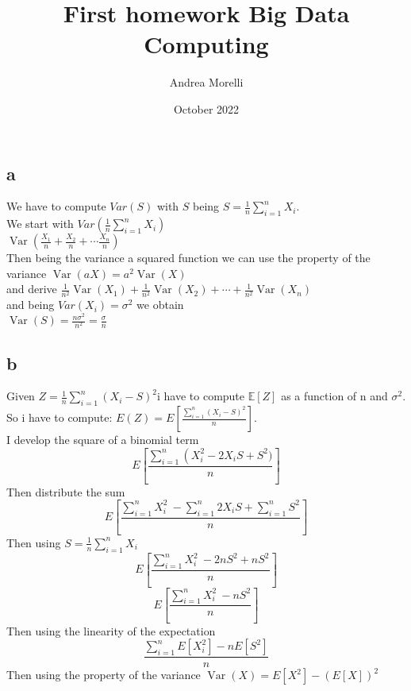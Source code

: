 \documentclass{article}
\title{First homework Big Data Computing}
\author{Andrea Morelli}
\date{October 2022}
\begin{document}
\maketitle

\section{}

\section{}
\subsection{a}
We have to compute $Var(S)$ with $S$ being 
$S=\frac{1}{n} \sum_{i=1}^n X_i$.\\
We start with $Var(\frac{1}{n} \sum_{i=1}^n X_i)$\\
$
\operatorname{Var}\left(\frac{X_1}{n}+\frac{X_2}{n}+\cdots \frac{X_n}{n}\right)
$\\
Then being the variance a squared function we can use the property of the variance $\operatorname{Var}(a X)=a^2 \operatorname{Var}(X)$\\
and derive $\frac{1}{n^2} \operatorname{Var}\left(X_1\right)+\frac{1}{n^2} \operatorname{Var}\left(X_2\right)+\cdots+\frac{1}{n^2} \operatorname{Var}\left(X_n\right)$\\
and being $Var(X_i)=\sigma^2$ we obtain\\
$\operatorname{Var}(S)=\frac{n \sigma^2}{n^2}=\frac{\sigma}{n}$


\subsection{b}
Given $Z=\frac{1}{n} \sum_{i=1}^n\left(X_i-S\right)^2$i have to compute $\mathbb{E}[Z]$ as a function of n and $\sigma^2$.
So i have to compute: $E\left(Z\right)=E\left[\frac{\sum_{i=1}^n\left(X_i-S\right)^2}{n}\right]$.\\I develop the square of a binomial term$$E\left[\frac{\sum_{i=1}^n\left(X_i^2 -2X_i S +S^2)}{n}\right]$$
Then distribute the sum
$$E\left[\frac{\sum_{i=1}^n X_i^2 \ -\sum_{i=1}^n 2X_i S +\sum_{i=1}^n S^2}{n}\right]$$
Then using $S=\frac{1}{n} \sum_{i=1}^n X_i$
$$E\left[\frac{\sum_{i=1}^n X_i^2 \ -2 nS^2 + nS^2}{n}\right]$$
$$E\left[\frac{\sum_{i=1}^n X_i^2 \ - nS^2 }{n}\right]$$
Then using the linearity of the expectation
$$\frac{\sum_{i=1}^nE[ X_i^2] - nE[S^2]}{n}$$
Then using the property of the variance $\operatorname{Var}(X)=E\left[X^2\right]-(E[X])^2$
\end{document}

